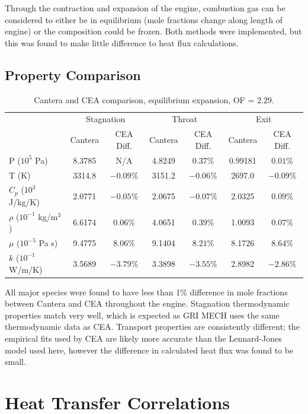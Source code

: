 \documentclass[11pt]{article}
\begin{document}
Through the contraction and expansion of the engine, combustion gas can be considered to either be in equilibrium (mole fractions change along length of engine) or the composition could be frozen. Both methods were implemented, but this was found to make little difference to heat flux calculations.

\subsection{Property Comparison}


\begin{table}[H]
  \centering
  \caption{Cantera and CEA comparison, equilibrium expansion, OF = 2.29.}
  \begin{tabular}{l c c c c c c}
    \toprule
    & \multicolumn{2}{c}{Stagnation} & \multicolumn{2}{c}{Throat} & \multicolumn{2}{c}{Exit} \\
    \cmidrule(lr){2-3} \cmidrule(lr){4-5} \cmidrule(lr){6-7}
    & Cantera & CEA Diff. & Cantera & CEA Diff. & Cantera & CEA Diff. \\
    \midrule
    P ($10^5$ Pa) & 8.3785 & N/A & 4.8249 & $0.37\%$ & 0.99181 & $0.01\%$ \\
    T (K) & 3314.8 & $-0.09\%$ & 3151.2 & $-0.06\%$ & 2697.0 & $-0.09\%$ \\
    $C_p$ ($10^3$ J/kg/K) & 2.0771 & $-0.05\%$ & 2.0675 & $-0.07\%$ & 2.0325 & $0.09\%$ \\
    $\rho$ ($10^{-1}$ kg/m$^3$) & 6.6174 & $0.06\%$ & 4.0651 & $0.39\%$ & 1.0093 & $0.07\%$\\
    $\mu$ ($10^{-5}$ Pa s) & 9.4775 & $8.06\%$ & 9.1404 & $8.21\%$ & 8.1726 & $8.64\%$ \\
    $k$ ($10^{-1}$ W/m/K) & 3.5689 & $-3.79\%$ & 3.3898 & $-3.55\%$ & 2.8982 & $-2.86\%$\\
    \bottomrule
  \end{tabular}
\end{table}

All major species were found to have less than 1\% difference in mole fractions between Cantera and CEA throughout the engine. Stagnation thermodynamic properties match very well, which is expected as GRI MECH uses the same thermodynamic data as CEA. Transport properties are consistently different; the empirical fits used by CEA are likely more accurate than the Lennard-Jones model used here, however the difference in calculated heat flux was found to be small.

\section{Heat Transfer Correlations}\label{sec:heat_transfer}
\end{document}
